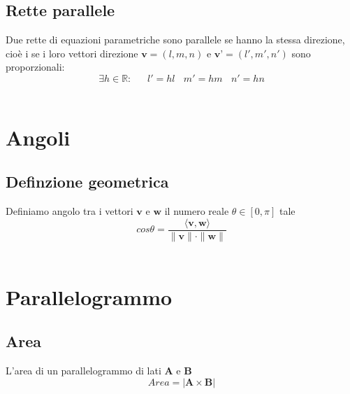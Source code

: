 \documentclass{article} %
\begin{document}
    \subsection*{Rette parallele}
    Due rette di equazioni parametriche
    sono parallele se hanno la stessa direzione, cioè i se i loro vettori direzione
    $ \textbf{v}=( l, m , n )$ e $ \textbf{v'}=( l', m' , n' ) $ sono proporzionali: 
    $$ \exists h \in \mathbb{R} : \ \ \ \ \ \ \ l' = hl \ \ \ \  m'=hm \ \ \ \ n' = h n  $$ \\


    \section*{Angoli}

    \subsection*{Definzione geometrica}
    Definiamo angolo tra i vettori $\textbf{v}$ e $\textbf{w}$ il numero reale $ \theta \in [0, \pi] $ tale
    $$ cos \theta = \dfrac{ \langle \textbf{v} , \textbf{w} \rangle }{ \| \textbf{v} \| \cdot \| \textbf{w} \| } $$ \\


    \section*{Parallelogrammo}
    \subsection*{Area}
    L'area di un parallelogrammo di lati $\textbf{A}$ e $\textbf{B}$ 
    $$ Area = | \textbf{A} \times \textbf{B} |  $$
\end{document}
